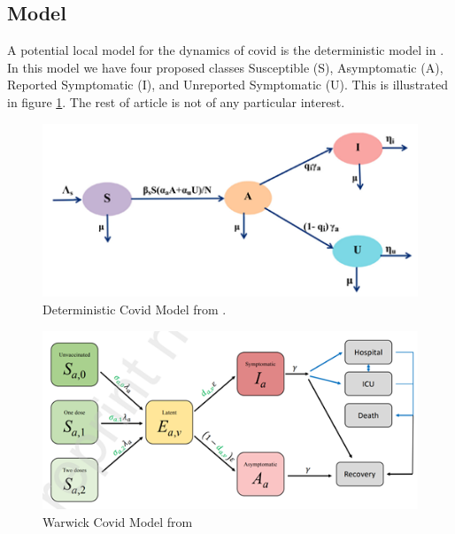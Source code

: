 \documentclass[a4paper,11pt]{article}
\theoremstyle{plain}
\theoremstyle{definition}
\begin{document}
\subsection{Model}

A potential local model for the dynamics of covid is the deterministic model in \citep{CovidModelIndia}. In this model we have four proposed classes Susceptible (S), Asymptomatic (A), Reported Symptomatic (I), and Unreported Symptomatic (U). This is illustrated in figure \ref{fig:determ}. The rest of article \citep{CovidModelIndia} is not of any particular interest.

\begin{figure}[hbtp]
	\centering %
	\includegraphics[width=5in]{ModelIndia.png} %
	\caption{Deterministic Covid Model from \citep{CovidModelIndia}.}
	\label{fig:determ}  %
\end{figure}

\begin{figure}[hbtp]
	\centering %
	\includegraphics[width=5in]{ModelWarwick.png} %
	\caption{Warwick Covid Model from \citep{WarwickNonPharm}}
	\label{fig:determ2}  %
\end{figure}
\end{document}
